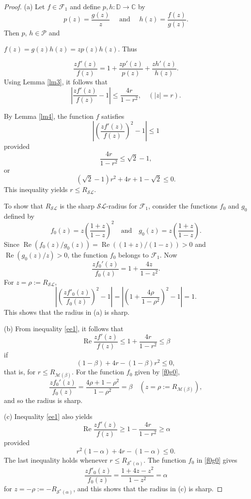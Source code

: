 \documentclass{amsart}
\begin{document}
\begin{proof} (a) Let $f\in \mathcal{F}_1$ and
define $p,h:\mathbb{D}\rightarrow \mathbb{C}$ by
\[p(z)=\frac{g(z)}{z}\quad \text{ and } \quad h(z)=\frac{f(z)}{g(z)}.\]
 Then $p$, $h \in\mathcal{P} $ and
 
 $f(z)=g(z)h(z)=zp(z)h(z)$. Thus
 
 \begin{equation*}\label{e1}
 \frac{zf'(z)}{f(z)}=1+\frac{zp'(z)}{p(z)}+\frac{zh'(z)}{h(z)}.
\end{equation*}
Using  Lemma \ref{lm3}, it follows that
\begin{equation}\label{ee1}
\left|\frac{zf'(z)}{f(z)}-1\right|\leq\frac{4r}{1-r^2}, \quad (|z|=r).
\end{equation}

By Lemma \ref{lm4}, the function $f$ satisfies
 \[ \left|\left(\frac{zf'(z)}{f(z)}\right)^2-1\right|\leq 1  \] provided
\begin{equation*}\label{e2}
\frac{4r}{1-r^2}\leq\sqrt2-1,
\end{equation*}
or
\[(\sqrt2-1)r^2+4r+1-\sqrt2 \leq0.\]
This inequality yields  $r \leq R_{\mathcal{SL}}. $

To show that $R_{\mathcal{SL}}$ is the sharp ${\mathcal{SL}}$-radius for $\mathcal{F}_1$, consider the functions $f_0$ and $g_0$ defined by
\begin{equation}\label{f0g0}
f_0(z)=z\left(\frac{1+z}{1-z}\right)^2 \quad \text{and} \quad g_0(z)=z \left(\frac{1+z}{1-z}\right).
\end{equation}
Since $\operatorname{Re}\left( f_0(z)/g_0(z)\right)=\operatorname{Re}((1+z)/(1-z))>0$  and $  \operatorname{Re} \left(g_0(z)/z\right)>0$,  the function
$f_0 $ belongs to $\mathcal{F}_1$. Now
\[ \frac{zf_0'(z)}{f_0(z)}= 1+\frac{4z}{1-z^2}.\]   For $z=\rho:=R_{\mathcal{SL}}$,
\[ \left|\left(\frac{zf'_0(z)}{f_0(z)}\right)^2-1\right|=\left|\left(1+\frac{4\rho}{1-\rho^2}\right)^2-1\right|=1  .\]
This shows that  the radius in (a)  is sharp.

(b) From inequality \eqref{ee1}, it follows that
\[\operatorname{Re}\frac{zf'(z)}{f(z)}\leq1+\frac{4r}{1-r^2}\leq \beta\]
if\[(1-\beta)+4r-(1-\beta)r^2\leq 0,\]
that is, for $r\leq R_{\mathcal{M}(\beta)}.$ For the function $f_0$ given by \eqref{f0g0},
\[ \frac{zf_0'(z)}{f_0(z)}= \frac{4\rho+1-\rho^2}{1-\rho^2}=\beta\quad ( z=\rho:=R_{\mathcal{M}(\beta)} ),\]
 and so the radius is sharp.

(c) Inequality \eqref{ee1} also yields
\[\operatorname{Re}\frac{zf'(z)}{f(z)}\geq1-\frac{4r}{1-r^2}\geq\alpha\]    provided
\[r^2(1-\alpha)+4r-(1-\alpha)\leq0.\]
The last inequality holds whenever  $r\leq R_{\mathcal{S}^*(\alpha)}$.
The function $f_0$ in \eqref{f0g0} gives
\[ \frac{zf'_0(z)}{f_0(z)}= \frac{ 1+4z-z^2}{1-z^2}=\alpha\]
for $z=-\rho:=-R_{\mathcal{S}^*(\alpha)}$, and this shows that the radius in (c) is sharp.


\end{proof}
\end{document}

